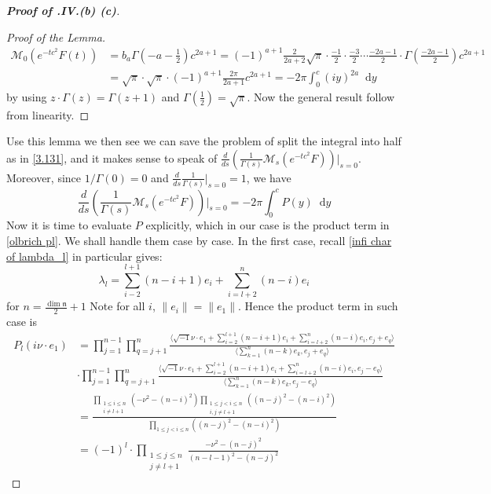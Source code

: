\documentclass[11pt]{report}
\theoremstyle{definition}
\theoremstyle{plain}
\newcommand{\brac}[1]{\langle #1 \rangle}
\newcommand{\norm}[1]{\lVert #1 \rVert}
\newcommand{\mass}[1]{\mathop{}\mathrm{d}{#1}}
\newcommand{\Lie}[1]{\mathfrak{#1}}
\begin{document}
\begin{proof}[\textbf{Proof of .IV.(b) (c)}]
\begin{proof}[Proof of the Lemma]
\begin{equation*}
\begin{split}
\mathcal{M}_0(e^{-tc^2}F(t))&=b_a\Gamma(-a-\frac{1}{2})c^{2a+1}=(-1)^{a+1}\frac{2}{2a+2}\sqrt{\pi}\cdot\frac{-1}{2}\cdot\frac{-3}{2}\cdots \frac{-2a-1}{2}\cdot\Gamma(\frac{-2a-1}{2})c^{2a+1}\\
&=\sqrt{\pi}\cdot\sqrt{\pi}\cdot(-1)^{a+1}\frac{2\pi}{2a+1}c^{2a+1}=-2\pi\int_0^c(iy)^{2a}\mass{y}
\end{split}
\end{equation*}
by using $z\cdot\Gamma(z)=\Gamma(z+1)$ and $\Gamma(\frac{1}{2})=\sqrt{\pi}$. Now the general result follow from linearity.
\end{proof}
Use this lemma we then see we can save the problem of split the integral into half as in \ref{3.131}, and it makes sense to speak of $\frac{d}{ds}(\frac{1}{\Gamma(s)}\mathcal{M}_s(e^{-tc^2}F))|_{s=0}$. Moreover, since $1/\Gamma(0)=0$ and $\frac{d}{ds}\frac{1}{\Gamma(s)}|_{s=0}=1$, we have \begin{equation}
\frac{d}{ds}(\frac{1}{\Gamma(s)}\mathcal{M}_s(e^{-tc^2}F))\Big|_{s=0}=-2\pi\int_0^cP(y)\mass{y}
\end{equation}
Now it is time to evaluate $P$ explicitly, which in our case is the product term in \ref{olbrich pl}. We shall handle them case by case. In the first case, recall \ref{infi char of lambda_l} in particular gives:
\begin{equation}
\lambda_l=\sum_{i-2}^{l+1}(n-i+1)e_i+\sum_{i=l+2}^{n}(n-i)e_i
\end{equation}
for $n=\frac{\dim\Lie{n}}{2}+1$ Note for all $i$, $\norm{e_i}=\norm{e_1}$. Hence the product term in such case is
\begin{equation}
\begin{split}
P_l(i\nu\cdot e_1)&=\prod_{j=1}^{n-1}\prod_{q=j+1}^{n}\frac{\brac{\sqrt{-1}\nu \cdot e_1+\sum_{i=2}^{l+1}(n-i+1)e_i+\sum_{i=l+2}^{n}(n-i)e_i, e_j+e_q}}{\brac{\sum_{k=1}^{n}(n-k)e_k, e_j+e_q}}\\
&\cdot\prod_{j=1}^{n-1}\prod_{q=j+1}^{n}\frac{\brac{\sqrt{-1}\nu\cdot e_1+\sum_{i=2}^{l+1}(n-i+1)e_i+\sum_{i=l+2}^{n}(n-i)e_i, e_j-e_q}}{\brac{\sum_{k=1}^{n}(n-k)e_k, e_j-e_q}}\\
&=\frac{\prod_{\substack{1\leq i\leq n\\ i\neq l+1}}(-\nu^2-(n-i)^2)\prod_{\substack{1\leq j<i\leq n\\ i,j\neq l+1}}((n-j)^2-(n-i)^2)}{\prod_{1\leq j<i\leq n}((n-j)^2-(n-i)^2)}\\
&=(-1)^l\cdot\prod_{\substack{1\leq j\leq n\\ j\neq l+1}}\frac{-\nu^2-(n-j)^2}{(n-l-1)^2-(n-j)^2}

\end{split}
\end{equation}
\end{proof}
\end{document}
